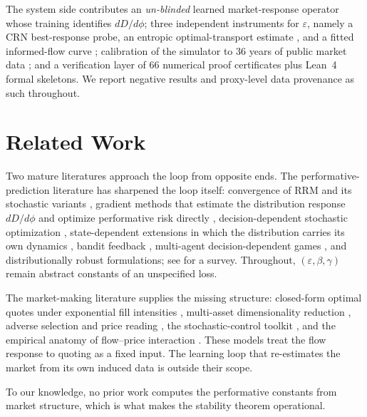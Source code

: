 \documentclass[sigconf]{acmart}
\newcommand{\eps}{\varepsilon}
\begin{document}
The system side contributes an \emph{un-blinded} learned market-response
operator whose training identifies $dD/d\phi$; three independent instruments
for $\eps$, namely a CRN best-response probe, an entropic optimal-transport
estimate \cite{cuturi2013sinkhorn,feydy2019interpolating,
peyre2019computational}, and a fitted informed-flow curve
\cite{cont2014price}; calibration of the simulator to 36 years of public
market data \cite{dickerson2023priced,friewald2012illiquidity}; and a
verification layer of 66 numerical proof certificates plus Lean~4
\cite{moura2021lean,mathlib2020} formal skeletons. We report negative
results and proxy-level data provenance as such throughout.

\section{Related Work}
\label{sec:related}

Two mature literatures approach the loop from opposite ends. The
performative-prediction literature has sharpened the loop itself:
convergence of RRM and its stochastic variants
\cite{perdomo2020performative,mendlerdunner2020stochastic}, gradient methods
that estimate the distribution response $dD/d\phi$ and optimize performative
risk directly \cite{izzo2021learn,miller2021echo}, decision-dependent
stochastic optimization \cite{drusvyatskiy2023stochastic}, state-dependent
extensions in which the distribution carries its own dynamics
\cite{li2022state,brown2022stateful}, bandit feedback
\cite{jagadeesan2022regret}, multi-agent decision-dependent games
\cite{narang2022multiplayer}, and distributionally robust formulations; see
\cite{hardt2023performative} for a survey. Throughout,
$(\eps,\beta,\gamma)$ remain abstract constants of an unspecified loss.

The market-making literature supplies the missing structure: closed-form
optimal quotes under exponential fill intensities
\cite{avellaneda2008highfrequency,gueant2013dealing}, multi-asset
dimensionality reduction \cite{bergault2021size}, adverse selection and
price reading \cite{barzykin2025adverse}, the stochastic-control toolkit
\cite{cartea2015algorithmic}, and the empirical anatomy of flow--price
interaction \cite{cont2014price}. These models treat the flow response to
quoting as a fixed input. The learning loop that re-estimates the market
from its own induced data is outside their scope.

To our knowledge, no prior work computes the performative constants from
market structure, which is what makes the stability theorem operational.
\end{document}
